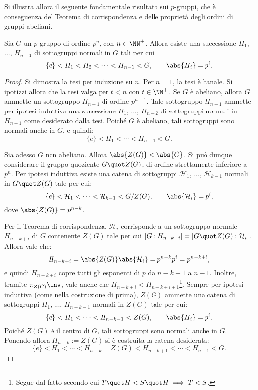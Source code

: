 \documentclass[12pt]{scrartcl}
\begin{document}
	
	Si illustra allora il seguente fondamentale risultato sui $p$-gruppi,
	che è conseguenza del Teorema di corrispondenza e delle proprietà degli
	ordini di gruppi abeliani.
	
	\begin{proposition}
		Sia $G$ un $p$-gruppo di ordine $p^n$, con $n \in \NN^+$. Allora
		esiste una successione $H_1$, ..., $H_{n-1}$ di sottogruppi normali in $G$
		tali per cui:
		\[ \{ e \} < H_1 < H_2 < \cdots < H_{n-1} < G, \qquad \abs{H_i} = p^i. \]
	\end{proposition}
	
	\begin{proof}
		Si dimostra la tesi per induzione su $n$. Per $n=1$, la tesi è banale. Si
		ipotizzi allora che la tesi valga per $t<n$ con $t \in \NN^+$. Se
		$G$ è abeliano, allora $G$ ammette un sottogruppo $H_{n-1}$ di ordine
		$p^{n-1}$. Tale sottogruppo $H_{n-1}$ ammette per ipotesi induttiva
		una successione $H_1$, ..., $H_{n-2}$ di sottogruppi normali in
		$H_{n-1}$ come desiderato dalla tesi.
		Poiché $G$ è abeliano, tali sottogruppi sono
		normali anche in $G$, e quindi:
		\[ \{ e \} < H_1 < \cdots < H_{n-1} < G. \] \smallskip
		
		
		Sia adesso $G$ non abeliano. Allora $\abs{Z(G)} < \abs{G}$. Si può
		dunque considerare il gruppo quoziente $G \quot Z(G)$, di ordine
		strettamente inferiore a $p^n$. Per ipotesi induttiva
		esiste una catena di sottogruppi $\mathcal{H}_1$, ...,
		$\mathcal{H}_{k-1}$ normali in $G \quot Z(G)$ tale per cui:
		\[ \{e\} < \mathcal{H}_1 < \cdots < \mathcal{H}_{k-1} < G/Z(G), \qquad \abs{\mathcal{H}_i} = p^i, \]
		dove $\abs{Z(G)} = p^{n-k}$. \medskip
		
		
		Per il Teorema di corrispondenza, $\mathcal{H}_i$ corrisponde
		a un sottogruppo normale $H_{n-k+i}$ di $G$ contenente $Z(G)$ tale per cui
		$[G : H_{n-k+i}] = [G \quot Z(G) : \mathcal{H}_i]$. Allora vale che:
		\[ H_{n-k+i} = \abs{Z(G)} \abs{\mathcal{H}_i} = p^{n-k} p^i = p^{n-k+i}, \]
		e quindi $H_{n-k+i}$ copre tutti gli esponenti di $p$ da $n-k+1$ a $n-1$.
		Inoltre, tramite $\pi_{Z(G)} \inv$, vale anche che $H_{n-k+i} < H_{n-k+i+1}$\footnote{Segue dal fatto
		secondo cui $T \quot H < S \quot H \implies T < S$.}. Sempre per ipotesi
		induttiva (come nella costruzione di prima), $Z(G)$ ammette una catena
		di sottogruppi $H_1$, ..., $H_{n-k-1}$ normali in $Z(G)$ tale per cui:
		\[
			\{e\} < H_1 < \cdots < H_{n-k-1} < Z(G), \qquad \abs{H_i} = p^i.
		\]
		Poiché $Z(G)$ è il centro di $G$, tali sottogruppi sono normali anche in $G$.
		Ponendo allora $H_{n-k} := Z(G)$ si è costruita la catena desiderata:
		\[ \{e\} < H_1 < \cdots < H_{n-k} = Z(G) < H_{n-k+1} < \cdots < H_{n-1} < G. \]
	\end{proof}
\end{document}
